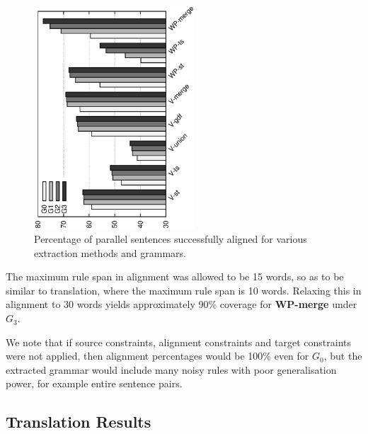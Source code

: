 \begin{figure}
  \begin{center}
    \includegraphics[width=6cm,angle=-90]{figures/coverage.eps}
    \caption{\label{fig:coverage} Percentage of parallel sentences successfully aligned for various extraction methods and grammars.}
  \end{center}
\end{figure}

The maximum rule span in alignment was allowed to be 15 words, so as to be
similar to translation, where the maximum rule span is 10 words. Relaxing this
in alignment to 30 words yields approximately 90\% coverage for {\bf WP-merge}
under $G_3$.

We note that if source constraints, alignment constraints and target constraints
were not applied, then alignment percentages would be 100\% even for $G_0$, but
the extracted grammar would include many noisy rules with poor generalisation
power, for example entire sentence pairs.

\subsection{Translation Results}
\label{sec:extractionFromPosteriorsTranslationResults}
    

